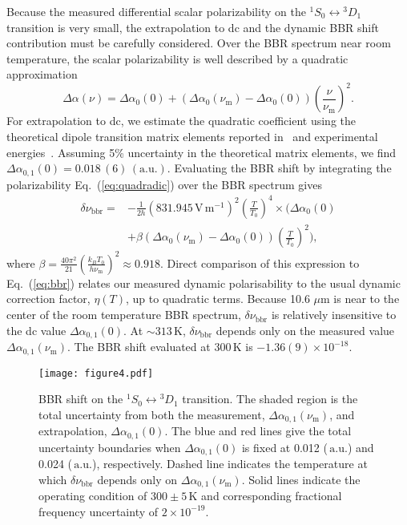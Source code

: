 \documentclass[pra,aps,showpacs,floatfix,twocolumn,nofootinbib,citeautoscript]{revtex4-1}
\newcommand{\eref}[1]{Eq.~(\ref{#1})}
\begin{document}
 Because the measured differential scalar polarizability on the $^1S_0\leftrightarrow{^3}D_1$ transition is very small, the extrapolation to dc and the dynamic BBR shift contribution must be carefully considered. Over the BBR spectrum near room temperature, the scalar polarizability is well described by a quadratic approximation
\begin{equation}
\label{eq:quadradic}
\Delta \alpha (\nu) = \Delta \alpha_0 (0) +(\Delta \alpha_0 (\nu_\mathrm{m})-\Delta \alpha_0 (0))\left(\frac{\nu}{\nu_\mathrm{m}} \right)^2.
\end{equation}
For extrapolation to dc, we estimate the quadratic coefficient using the theoretical dipole transition matrix elements reported in~\cite{luprop2016} and experimental energies~\cite{RalKraRea11}.  Assuming 5\% uncertainty in the theoretical matrix elements, we find $\Delta \alpha_{0,1} (0) = 0.018\,(6)\,(\mathrm{a.u.})$. Evaluating the BBR shift by integrating the polarizability \eref{eq:quadradic} over the BBR spectrum gives
\begin{equation}
\label{eq:quadbbr}
\begin{split}
\delta \nu_{\mathrm{bbr}} =& -\frac{1}{2h} (831.945\, \mathrm{V}\,\mathrm{m}^{-1})^2 \left( \frac{T}{T_0}\right)^4 \times \Bigg(\Delta \alpha_0 (0)  \\
&+\beta(\Delta\alpha_0(\nu_\mathrm{m})-\Delta\alpha_0(0)) \left( \frac{T}{T_0}\right)^2 \Bigg), 
\end{split}
\end{equation}
where $\beta=\frac{40 \pi^2}{21}\left(\frac{k_B T_0}{h \nu_\mathrm{m}}\right)^2\approx0.918$.  Direct comparison of this expression to \eref{eq:bbr} relates our measured dynamic polarisability to the usual dynamic correction factor, $\eta(T)$, up to quadratic terms. Because 10.6 $\mu$m is near to the center of the room temperature BBR spectrum, $\delta \nu_{\mathrm{bbr}}$  is relatively insensitive to the dc value $\Delta\alpha_{0,1}(0)$. At $\sim313\,\mathrm{K}$,  $\delta \nu_{\mathrm{bbr}}$ depends only on the measured value $\Delta \alpha_{0,1}(\nu_\mathrm{m})$.  The BBR shift evaluated at $300\,\mathrm{K}$ is $-1.36(9)\times10^{-18}$.  

\begin{figure}
\texttt{[image: figure4.pdf]}
\caption{BBR shift on the $^1S_0\leftrightarrow{^3}D_1$ transition.  The shaded region is the total uncertainty from both the measurement, $\Delta \alpha_{0,1}(\nu_\mathrm{m})$, and extrapolation, $\Delta \alpha_{0,1}(0)$. The blue and red lines give the total uncertainty boundaries when $\Delta\alpha_{0,1}(0)$ is fixed at 0.012 ($\,\mathrm{a.u.}$) and 0.024 ($\,\mathrm{a.u.}$), respectively. Dashed line indicates the temperature at which $\delta \nu_{\mathrm{bbr}} $ depends only on $\Delta \alpha_{0,1}(\nu_\mathrm{m})$. Solid lines indicate the operating condition of $300\pm5\,\mathrm{K}$ and corresponding fractional frequency uncertainty of $2\times10^{-19}$.}
\label{fig:bbr}
\end{figure}
\end{document}
